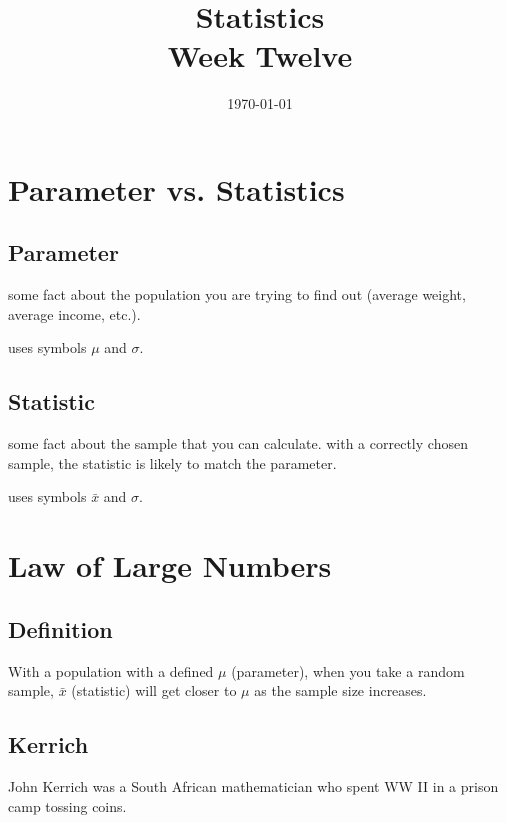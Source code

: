 \documentclass[portrait]{exam}
\title{Statistics \\ Week Twelve}
\date{\today}
\author{}
\begin{document}
  \maketitle
  \tableofcontents

  \section{Parameter vs. Statistics}
  \subsection{Parameter}
  \begin{itemize*} 
    \item some fact about the population you are trying to find out (average
      weight, average income, etc.). 
    \item uses symbols $\mu$ and $\sigma$.
  \end{itemize*}

  \subsection{Statistic}
  \begin{itemize*} 
    \item some fact about the sample that you can calculate. with a
      correctly chosen sample, the statistic is likely to match the
      parameter.
    \item uses symbols $\bar{x}$ and $\sigma$.
  \end{itemize*}

  \section{Law of Large Numbers}
  \subsection{Definition}
  With a population with a defined $\mu$ (parameter), when you take a random sample,
  $\bar{x}$ (statistic) will get closer to $\mu$ as the sample size increases.

  \subsection{Kerrich}
  John Kerrich was a South African mathematician who spent WW II in a prison camp
  tossing coins.
\end{document}
